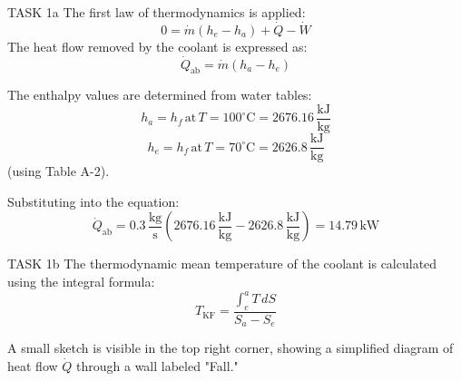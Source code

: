 TASK 1a  
The first law of thermodynamics is applied:  
\[
0 = \dot{m} (h_e - h_a) + \dot{Q} - \dot{W}
\]  
The heat flow removed by the coolant is expressed as:  
\[
\dot{Q}_{\text{ab}} = \dot{m} (h_a - h_e)
\]  

The enthalpy values are determined from water tables:  
\[
h_a = h_f \, \text{at} \, T = 100^\circ\text{C} = 2676.16 \, \frac{\text{kJ}}{\text{kg}}
\]  
\[
h_e = h_f \, \text{at} \, T = 70^\circ\text{C} = 2626.8 \, \frac{\text{kJ}}{\text{kg}}
\]  
(using Table A-2).  

Substituting into the equation:  
\[
\dot{Q}_{\text{ab}} = 0.3 \, \frac{\text{kg}}{\text{s}} \left( 2676.16 \, \frac{\text{kJ}}{\text{kg}} - 2626.8 \, \frac{\text{kJ}}{\text{kg}} \right) = 14.79 \, \text{kW}
\]  

TASK 1b  
The thermodynamic mean temperature of the coolant is calculated using the integral formula:  
\[
T_{\text{KF}} = \frac{\int_{e}^{a} T \, dS}{S_a - S_e}
\]  

A small sketch is visible in the top right corner, showing a simplified diagram of heat flow \( \dot{Q} \) through a wall labeled "Fall."